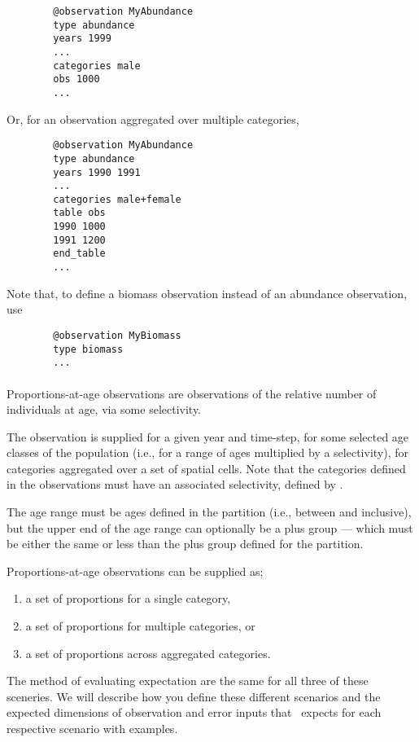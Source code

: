{\small{\begin{verbatim}
		@observation MyAbundance
		type abundance
		years 1999
		...
		categories male 
		obs 1000
		...
		\end{verbatim}}}

Or, for an observation aggregated over multiple categories,

{\small{\begin{verbatim}
		@observation MyAbundance
		type abundance
		years 1990 1991
		...
		categories male+female
		table obs
		1990 1000
		1991 1200
		end_table
		...
		\end{verbatim}}}


Note that, to define a biomass observation instead of an abundance observation, use 

{\small{\begin{verbatim}
		@observation MyBiomass
		type biomass
		...
		\end{verbatim}}}

\paragraph*{}
Proportions-at-age observations are observations of the relative number of individuals at age, via some selectivity. 

The observation is supplied for a given year and time-step, for some selected age classes of the population (i.e., for a range of ages multiplied by a selectivity), for categories aggregated over a set of spatial cells. Note that the categories defined in the observations must have an associated selectivity, defined by .

The age range must be ages defined in the partition (i.e., between  and  inclusive), but the upper end of the age range can optionally be a plus group --- which must be either the same or less than the plus group defined for the partition. 


Proportions-at-age observations can be supplied as; 
\begin{enumerate}
	\item a set of proportions for a single category, 
	\item a set of proportions for multiple categories, or
	\item a set of proportions across aggregated categories.
\end{enumerate}

The method of evaluating expectation are the same for all three of these sceneries. We will describe how you define these different scenarios and the expected dimensions of observation and error inputs that \CNAME\ expects for each respective scenario with examples.

